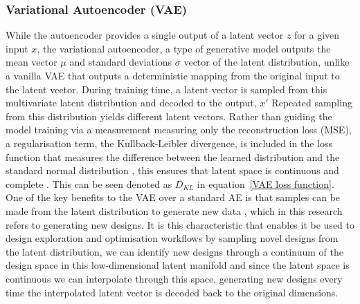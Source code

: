 \documentclass{article}
\begin{document}
\subsubsection{Variational Autoencoder (VAE)}
While the autoencoder provides a single output of a latent vector $z$ for a given input $x$, the variational autoencoder, a type of generative model outputs the mean vector $\mu$ and standard deviations $\sigma$ vector of the latent distribution, unlike a vanilla VAE that outputs a deterministic mapping from the original input to the latent vector. During training time, a latent vector is sampled from this multivariate latent distribution and decoded to the output, $x'$ Repeated sampling from this distribution yields different latent vectors. Rather than guiding the model training via a measurement measuring only the reconstruction loss (MSE), a regularisation term, the Kullback-Leibler divergence, is included in the loss function that measures the difference between the learned distribution and the standard normal distribution \citep{Huang2022}, this ensures that latent space is continuous and complete \citep{Lew2021}. This can be seen denoted as $D_{KL}$ in equation~\eqref{VAE loss function}. One of the key benefits to the VAE over a standard AE is that samples can be made from the latent distribution to generate new data \citep{Danhaive2022}, which in this research refers to generating new designs. It is this characteristic that enables it be used to design exploration and optimisation workflows by sampling novel designs from the latent distribution, we can identify new designs through a continuum of the design space in this low-dimensional latent manifold and since the latent space is continuous we can interpolate through this space, generating new designs every time the interpolated latent vector is decoded back to the original dimensions.
\end{document}
